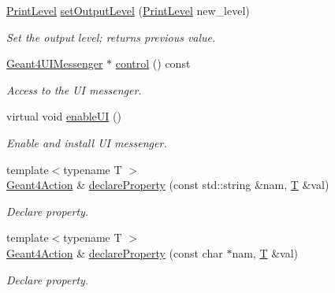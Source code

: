\begin{DoxyCompactItemize}
\hyperlink{namespace_d_d4hep_a5b5a64d56252469451f2020a27d57d42}{PrintLevel} \hyperlink{class_d_d4hep_1_1_simulation_1_1_geant4_action_a20453f25c4556d21e25b68f140955cc3}{setOutputLevel} (\hyperlink{namespace_d_d4hep_a5b5a64d56252469451f2020a27d57d42}{PrintLevel} new\_\-level)
\begin{DoxyCompactList}\small\item\em Set the output level; returns previous value. \item\end{DoxyCompactList}\item 
\hyperlink{class_d_d4hep_1_1_simulation_1_1_geant4_u_i_messenger}{Geant4UIMessenger} $\ast$ \hyperlink{class_d_d4hep_1_1_simulation_1_1_geant4_action_ae5e218a61d3dceff2d164429b854fb61}{control} () const 
\begin{DoxyCompactList}\small\item\em Access to the UI messenger. \item\end{DoxyCompactList}\item 
virtual void \hyperlink{class_d_d4hep_1_1_simulation_1_1_geant4_action_a3cc9526eece0aaceec6b62fa74d8c055}{enableUI} ()
\begin{DoxyCompactList}\small\item\em Enable and install UI messenger. \item\end{DoxyCompactList}\item 
{\footnotesize template$<$typename T $>$ }\\\hyperlink{class_d_d4hep_1_1_simulation_1_1_geant4_action}{Geant4Action} \& \hyperlink{class_d_d4hep_1_1_simulation_1_1_geant4_action_acef2b66c2126c84bec80d8f57ceb9789}{declareProperty} (const std::string \&nam, \hyperlink{class_t}{T} \&val)
\begin{DoxyCompactList}\small\item\em Declare property. \item\end{DoxyCompactList}\item 
{\footnotesize template$<$typename T $>$ }\\\hyperlink{class_d_d4hep_1_1_simulation_1_1_geant4_action}{Geant4Action} \& \hyperlink{class_d_d4hep_1_1_simulation_1_1_geant4_action_abd5a683c0c6511aabb8ed0502ad25ee6}{declareProperty} (const char $\ast$nam, \hyperlink{class_t}{T} \&val)
\begin{DoxyCompactList}\small\item\em Declare property. \item\end{DoxyCompactList}\item 

\end{DoxyCompactItemize}
